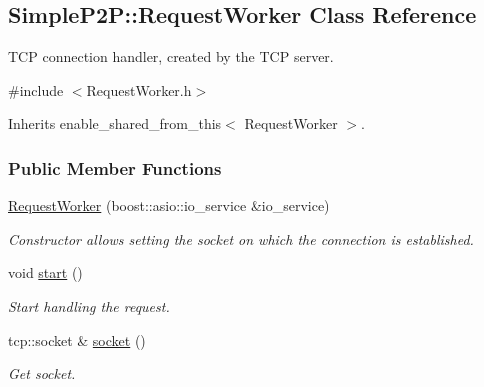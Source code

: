 \hypertarget{classSimpleP2P_1_1RequestWorker}{}\subsection{Simple\+P2P\+:\+:Request\+Worker Class Reference}
\label{classSimpleP2P_1_1RequestWorker}


T\+CP connection handler, created by the T\+CP server.  




{\ttfamily \#include $<$Request\+Worker.\+h$>$}



Inherits enable\+\_\+shared\+\_\+from\+\_\+this$<$ Request\+Worker $>$.

\subsubsection*{Public Member Functions}
\begin{DoxyCompactItemize}
\item 
\mbox{\label{classSimpleP2P_1_1RequestWorker_abccdef4b69527693cc3d8681cead05b1}} 
\hyperlink{classSimpleP2P_1_1RequestWorker_abccdef4b69527693cc3d8681cead05b1}{Request\+Worker} (boost\+::asio\+::io\+\_\+service \&io\+\_\+service)
\begin{DoxyCompactList}\small\item\em Constructor allows setting the socket on which the connection is established. \end{DoxyCompactList}\item 
\mbox{\label{classSimpleP2P_1_1RequestWorker_a08b2e9500f0e6d84c0d79f82207dd16d}} 
void \hyperlink{classSimpleP2P_1_1RequestWorker_a08b2e9500f0e6d84c0d79f82207dd16d}{start} ()
\begin{DoxyCompactList}\small\item\em Start handling the request. \end{DoxyCompactList}\item 
\mbox{\label{classSimpleP2P_1_1RequestWorker_abcac032e7b8a594f375bb36f92beed64}} 
tcp\+::socket \& \hyperlink{classSimpleP2P_1_1RequestWorker_abcac032e7b8a594f375bb36f92beed64}{socket} ()
\begin{DoxyCompactList}\small\item\em Get socket. \end{DoxyCompactList}\end{DoxyCompactItemize}


